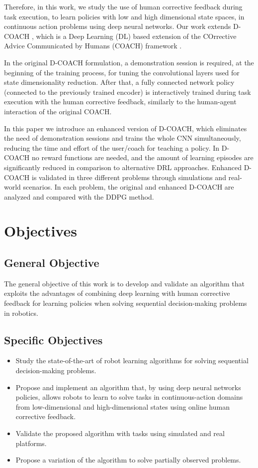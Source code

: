 \begin{intro}
Therefore, in this work, we study the use of human corrective feedback during task execution, to learn policies with low and high dimensional state spaces, in continuous action problems using deep neural networks. Our work extends D-COACH \cite{perez2018interactive}, which is a Deep Learning (DL) based extension of the COrrective Advice Communicated by Humans (COACH) framework \cite{Celemin2018AnInteractive}. 

In the original D-COACH formulation, a demonstration session is required, at the beginning of the training process, for tuning the convolutional layers used for state dimensionality reduction. After that, a fully connected network policy (connected to the previously trained encoder) is interactively trained during task execution with the human corrective feedback, similarly to the human-agent interaction of the original COACH.

In this paper we introduce an enhanced version of D-COACH, which eliminates the need of demonstration sessions and trains the whole CNN simultaneously, reducing the time and effort of the user/coach for teaching a policy.  In D-COACH no reward functions are needed, and the amount of learning episodes are significantly reduced in comparison to alternative DRL approaches. Enhanced D-COACH is validated in three different problems through simulations and real-world scenarios. In each problem, %
the original and enhanced D-COACH are analyzed and compared with the DDPG method. 


\section{Objectives}
\subsection{General Objective}
The general objective of this work is to develop and validate an algorithm that exploits the advantages of combining deep learning with human corrective feedback for learning policies when solving sequential decision-making problems in robotics. 

\subsection{Specific Objectives}

\begin{itemize}
    \item Study the state-of-the-art of robot learning algorithms for solving sequential decision-making problems.
    \item Propose and implement an algorithm that, by using deep neural networks policies, allows robots to learn to solve tasks in continuous-action domains from low-dimensional and high-dimensional states using online human corrective feedback. 
    \item Validate the proposed algorithm with tasks using simulated and real platforms.
    \item Propose a variation of the algorithm to solve partially observed problems.
\end{itemize}


\end{intro}
